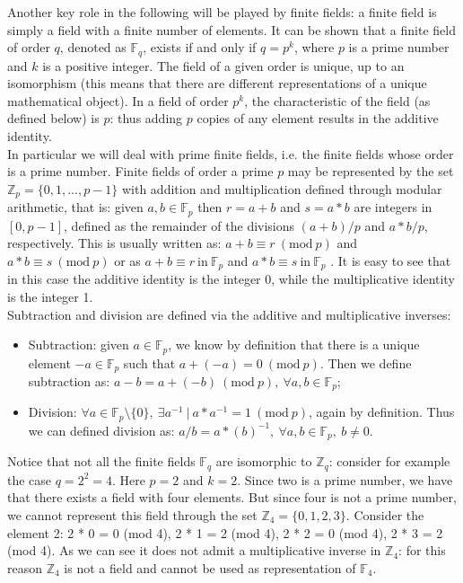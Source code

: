 \bigskip
\noindent
Another key role in the following will be played by finite fields: a finite field is simply a field with a finite number of elements. It can be shown that a finite field of order $q$, denoted as $\mathbb{F}_q$, exists if and only if $q = p^k$, where $p$ is a prime number and $k$ is a positive integer. The field of a given order is unique, up to an isomorphism (this means that there are different representations of a unique mathematical object). In a field of order $p^k$, the characteristic of the field (as defined below) is $p$: thus adding $p$ copies of any element results in the additive identity. 
\\
In particular we will deal with prime finite fields, i.e. the finite fields whose order is a prime number. Finite fields of order a prime $p$ may be represented by the set $\mathbb{Z}_p = \{0, 1, ..., p-1\}$ with addition and multiplication defined through modular arithmetic, that is: given $a, b \in \mathbb{F}_p$ then $r = a + b$ and $s = a * b$ are integers in $[0, p - 1]$, defined as the remainder of the divisions $(a + b)/p$ and $a*b/p$, respectively. This is usually written as: $a + b \equiv r \ (\text{mod} \ p)$ and $a * b \equiv s \ (\text{mod} \ p)$ or as $a + b \equiv r \ \text{in} \ \mathbb{F}_p$ and $a * b \equiv s \ \text{in} \ \mathbb{F}_p$ . It is easy to see that in this case the additive identity is the integer 0, while the multiplicative identity is the integer 1.
\\
Subtraction and division are defined via the additive and multiplicative inverses:
\begin{itemize}
	\item Subtraction: given $a \in \mathbb{F}_p$, we know by definition that there is a unique element $-a \in \mathbb{F}_p$ such that $a + (-a) = 0 \ (\text{mod} \ p)$. Then we define subtraction as: $a - b = a + (-b) \ (\text{mod} \ p), \ \forall a, b \in \mathbb{F}_p$;
	\item Division: $\forall a \in \mathbb{F}_p \text{\textbackslash} \{0\}, \ \exists a^{-1} \ | \ a * a^{-1} = 1 \ (\text{mod} \ p)$, again by definition. Thus we can defined division as: $a / b = a * (b)^{-1}, \ \forall a, b \in \mathbb{F}_p, \ b \neq 0$.
\end{itemize}
Notice that not all the finite fields $\mathbb{F}_q$ are isomorphic to $\mathbb{Z}_q$: consider for example the case $q = 2^2 = 4$. Here $p = 2$ and $k = 2$. Since two is a prime number, we have that there exists a field with four elements. But since four is not a prime number, we cannot represent this field through the set $\mathbb{Z}_4 = \{0, 1, 2, 3\}$. Consider the element 2: 2 * 0 = 0 (mod 4), 2 * 1 = 2 (mod 4), 2 * 2 = 0 (mod 4), 2 * 3 = 2 (mod 4). As we can see it does not admit a multiplicative inverse in $\mathbb{Z}_4$: for this reason $\mathbb{Z}_4$ is not a field and cannot be used as representation of $\mathbb{F}_4$.


